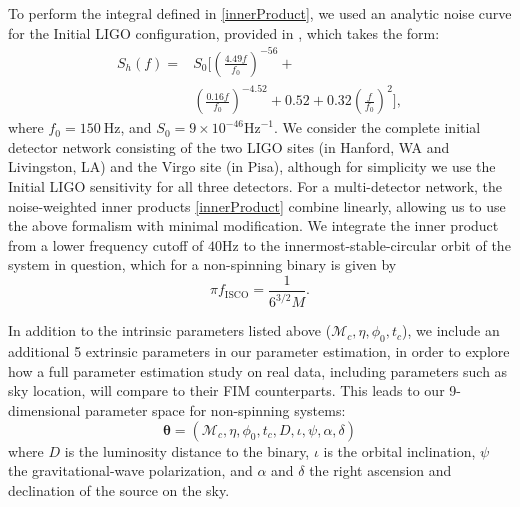 \documentclass{emulateapj}
\begin{document}
To perform the integral defined in \eqref{innerProduct}, we used an
analytic noise curve for the Initial LIGO configuration, provided in
\citet{DarmourNoiseCurve}, which takes the form:
\begin{align}
 S_h(f)=&S_0\Big[ \left(\frac{4.49 f}{f_0} \right)^{-56} + \nonumber\\
 &\left(\frac{0.16f}{f_0}\right) ^{-4.52}+0.52+0.32\left( \frac{f}{f_0}\right) ^2\Big],
 \label{PSD}
\end{align}
where $f_0 = 150~\text{Hz}$, and $S_0 = 9\times
10^{-46}\text{Hz}^{-1}$.  We consider the complete initial detector
network consisting of the two LIGO sites (in Hanford, WA and
Livingston, LA) and the Virgo site (in Pisa), although for simplicity
we use the Initial LIGO sensitivity for all three detectors.  For a
multi-detector network, the noise-weighted inner products
\eqref{innerProduct} combine linearly, allowing us to use the above
formalism with minimal modification.  We integrate the inner product
from a lower frequency cutoff of $40\text{Hz}$ to the
innermost-stable-circular orbit of the system in question, which for a
non-spinning binary is given by
\begin{equation}
  \pi f_{\text{ISCO}} = \frac{1}{6^{3/2}M}.
  \label{ISCOFrequency}
\end{equation}
   
In addition to the intrinsic parameters listed above ($\mathcal{M}_c,
\eta, \phi_0,t_c$), we include an additional 5 extrinsic parameters in
our parameter estimation, in order to explore how a full parameter
estimation study on real data, including parameters such as sky
location, will compare to their FIM counterparts.  This leads to our
9-dimensional parameter space for non-spinning systems:
\begin{equation}
\boldsymbol{\theta} =  (\mathcal{M}_c, \eta, \phi_0,t_c,D,\iota,\psi,\alpha,\delta)
\label{parameterspace}
\end{equation}
where $D$ is the luminosity distance to the binary, $\iota$ is the
orbital inclination, $\psi$ the gravitational-wave polarization, and
$\alpha$ and $\delta$ the right ascension and declination of the
source on the sky.
\end{document}
